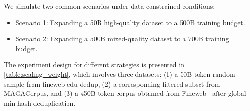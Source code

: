 \begin{table*}[h]
  \vspace{-1em}
  \centering
  \caption{Scaling experiments data recipe, values represent \#unique\_tokens × \#epochs.}
  \begin{adjustbox}{max width=\textwidth}
  \end{adjustbox}

  \label{table:scaling_weight}
\end{table*}

We simulate two common scenarios under data-constrained conditions:
\begin{itemize}[leftmargin=1.5em]
  \vspace{-0.5em}
  \item Scenario 1: Expanding a 50B high-quality dataset to a 500B training budget.
  \item Scenario 2: Expanding a 500B mixed-quality dataset to a 700B training budget.
\end{itemize}
\vspace{-0.5em}
The experiment design for different strategies is presented in \autoref{table:scaling_weight},
which involves three datasets:
(1) a 50B-token random sample from fineweb-edu-dedup,
(2) a corresponding filtered subset from MAGACorpus,
and (3) a 450B-token corpus obtained from Fineweb~\citep{penedo2024finewebdatasets} after global min-hash deduplication.


